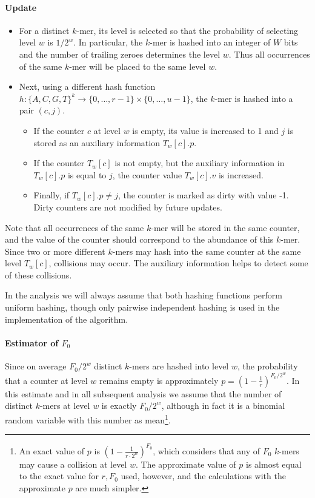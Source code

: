 \paragraph{Update}
\begin{itemize}
\item For a distinct $k$-mer, its level is selected so that the probability of selecting 
level $w$ is $1/2^w$. In particular, the $k$-mer is hashed into an integer of $W$ bits 
and the number of trailing zeroes determines the level $w$. Thus all occurrences of the same
$k$-mer will be placed to the same level $w$.

\item Next, using a different hash function
$h: \{A, C, G, T\}^k \rightarrow \{ 0, \dots, r-1\} \times \{ 0, \dots, u-1\}$, 
the $k$-mer is hashed into a pair $(c, j)$. 
\begin{itemize}
\item If the counter $c$ at level $w$ is empty, its value is increased to 1 and $j$
is stored as an auxiliary information  $T_w[c].p$.
\item If the counter $T_w[c]$ is not empty, but the auxiliary information in $T_w[c].p$ 
is equal to $j$, the counter value $T_w[c].v$ is increased.
\item Finally, if $T_w[c].p \neq j$, the counter is marked as dirty with value -1.
Dirty counters are not modified by future updates.
\end{itemize}
\end{itemize}
Note that all occurrences of the same $k$-mer will be stored in the same counter, 
and the value of the counter should correspond to the abundance of this $k$-mer.
Since two or more different $k$-mers may hash into the same counter at the same
level $T_w[c]$, collisions may occur. The auxiliary information helps to detect
some of these collisions.

In the analysis we will always assume that both hashing functions perform uniform hashing,
though only pairwise independent hashing is used in the implementation of the algorithm.

\paragraph{Estimator of $F_0$}
Since on average $F_0 / 2^w$ distinct $k$-mers are hashed into level $w$, the probability
that a counter at level $w$ remains empty is approximately $p = (1 - \frac{1}{r})^{F_0/2^w}$.
In this estimate and in all subsequent analysis we assume that the number of distinct $k$-mers
at level $w$ is exactly $F_0/2^w$, although in fact it is a binomial random variable with
this number as mean\footnote{An exact value of $p$ is $(1 - \frac{1}{r \cdot 2^w})^{F_0}$,
which considers that any of $F_0$ $k$-mers may cause a collision at level $w$.
The approximate value of $p$ is almost equal to the exact value for $r, F_0$ used, however,
and the calculations with the approximate $p$ are much simpler.}.

